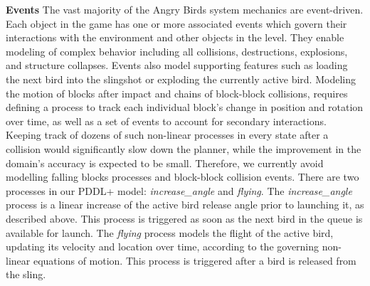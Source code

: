 \documentclass[letterpaper]{article} %
\begin{document}
\noindent\textbf{Events}
The vast majority of the Angry Birds system mechanics are event-driven.
\vspace{-3.44mm}
Each object in the game has one or more associated events which govern their interactions with the environment and other objects in the level.
They enable modeling of complex behavior including all collisions, destructions, explosions, and structure collapses. Events also model supporting features such as loading the next bird into the slingshot or exploding the currently active bird.
Modeling the motion of blocks after impact and chains of block-block collisions, requires defining a process to track each individual block's change in position and rotation over time, as well as a set of events to account for secondary interactions.
Keeping track of dozens of such non-linear processes in every state after a collision would significantly slow down the planner, while the improvement in the domain's accuracy is expected to be small.
Therefore, we currently avoid modelling falling blocks processes and block-block collision events. %
There are two processes in our PDDL+ model: \textit{increase\_angle} and \textit{flying}.  The \textit{increase\_angle} process is a linear increase of the active bird release angle prior to launching it, as described above. This process is triggered as soon as the next bird in the queue is available for launch. %
The \textit{flying} process models the flight of the active bird, updating its velocity and location over time, according to the governing non-linear equations of motion. This process is triggered after a bird is released from the sling. %
\end{document}

